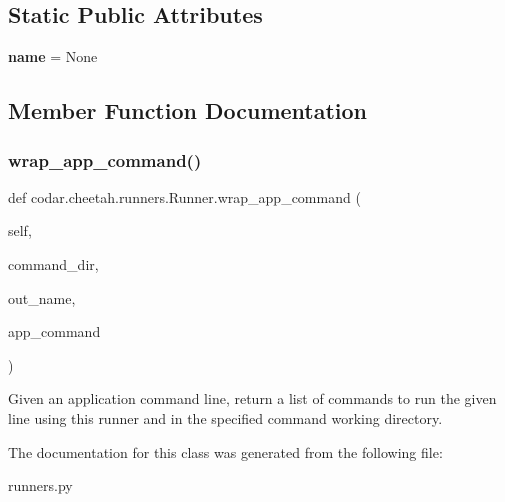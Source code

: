 \subsection*{Static Public Attributes}
\begin{DoxyCompactItemize}
\item 
\mbox{\label{classcodar_1_1cheetah_1_1runners_1_1_runner_aa2c0d84fbe4396e2a42cb84923c3a264}} 
{\bfseries name} = None
\end{DoxyCompactItemize}


\subsection{Member Function Documentation}
\mbox{\label{classcodar_1_1cheetah_1_1runners_1_1_runner_a542d501b4c640bb9c27b2777a831c351}} 
\subsubsection{\texorpdfstring{wrap\+\_\+app\+\_\+command()}{wrap\_app\_command()}}
{\footnotesize\ttfamily def codar.\+cheetah.\+runners.\+Runner.\+wrap\+\_\+app\+\_\+command (\begin{DoxyParamCaption}\item[{}]{self,  }\item[{}]{command\+\_\+dir,  }\item[{}]{out\+\_\+name,  }\item[{}]{app\+\_\+command }\end{DoxyParamCaption})}

\begin{DoxyVerb}Given an application command line, return a list of commands to
run the given line using this runner and in the specified command
working directory.
\end{DoxyVerb}
 

The documentation for this class was generated from the following file\+:\begin{DoxyCompactItemize}
\item 
runners.\+py\end{DoxyCompactItemize}

